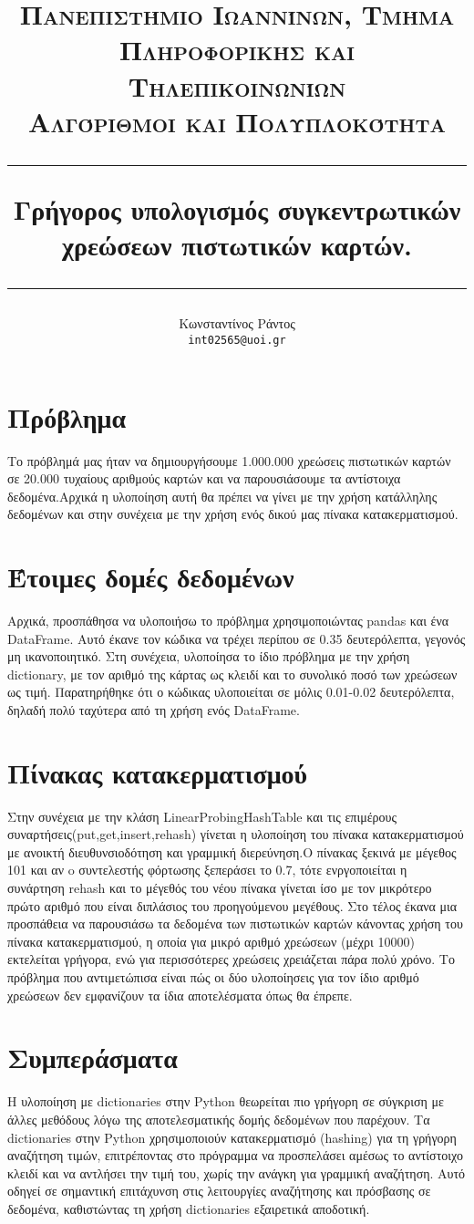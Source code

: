 \documentclass{article}
\title{%
   \normalsize \textsc{Πανεπιστήμιο Ιωαννίνων, Τμήμα Πληροφορικής και Τηλεπικοινωνίων} \\ [1em]
   \normalsize \textsc{Αλγόριθμοι και Πολυπλοκότητα} \\ [1em]
   \vspace{0.5cm}
   \hrule
   \vspace{0.4cm}
   \huge Γρήγορος υπολογισμός συγκεντρωτικών χρεώσεων πιστωτικών καρτών.
   \vspace{0.5cm}
   \hrule
   \vspace{0.5cm}
}
\author{%
   \normalfont
   Κωνσταντίνος Ράντος\\
   \texttt{int02565@uoi.gr}  
}
\date{}
\begin{document}
\maketitle

\section*{Πρόβλημα}
Το πρόβλημά μας ήταν να δημιουργήσουμε 1.000.000 χρεώσεις πιστωτικών καρτών σε 20.000 τυχαίους αριθμούς καρτών και να παρουσιάσουμε τα αντίστοιχα δεδομένα.Αρχικά η υλοποίηση αυτή θα πρέπει να γίνει με την χρήση κατάλληλης δεδομένων και στην συνέχεια με την χρήση ενός δικού μας πίνακα κατακερματισμού.
\vspace{0.5cm}

\section{Έτοιμες δομές δεδομένων}
 Αρχικά, προσπάθησα να υλοποιήσω το πρόβλημα χρησιμοποιώντας pandas και ένα DataFrame. Αυτό έκανε τον κώδικα να τρέχει περίπου σε 0.35 δευτερόλεπτα, γεγονός μη ικανοποιητικό. Στη συνέχεια, υλοποίησα το ίδιο πρόβλημα με την χρήση dictionary, με τον αριθμό της κάρτας ως κλειδί και το συνολικό ποσό των χρεώσεων ως τιμή. Παρατηρήθηκε ότι ο κώδικας υλοποιείται σε μόλις 0.01-0.02 δευτερόλεπτα, δηλαδή πολύ ταχύτερα από τη χρήση ενός DataFrame.

\section{Πίνακας κατακερματισμού}
Στην συνέχεια με την κλάση LinearProbingHashTable και τις επιμέρους συναρτήσεις(put,get,insert,rehash) γίνεται η υλοποίηση του πίνακα κατακερματισμού με ανοικτή διευθυνσιοδότηση και γραμμική διερεύνηση.Ο πίνακας ξεκινά με μέγεθος 101 και αν o συντελεστής φόρτωσης ξεπεράσει το 0.7, τότε ενργοποιείται η συνάρτηση rehash και το μέγεθός του νέου πίνακα  γίνεται ίσο με τον μικρότερο πρώτο αριθμό που είναι διπλάσιος του προηγούμενου μεγέθους. Στο τέλος έκανα μια προσπάθεια να παρουσιάσω τα δεδομένα των πιστωτικών καρτών κάνοντας χρήση του πίνακα κατακερματισμού, η οποία για μικρό αριθμό χρεώσεων (μέχρι 10000) εκτελείται γρήγορα, ενώ για περισσότερες χρεώσεις χρειάζεται πάρα πολύ χρόνο.
Το πρόβλημα που αντιμετώπισα είναι πώς οι δύο υλοποίησεις για τον ίδιο αριθμό χρεώσεων δεν εμφανίζουν τα ίδια αποτελέσματα όπως θα έπρεπε.

\section{Συμπεράσματα}
   Η υλοποίηση με dictionaries στην Python θεωρείται πιο γρήγορη σε σύγκριση με άλλες μεθόδους λόγω της αποτελεσματικής δομής δεδομένων που παρέχουν. Τα dictionaries στην Python χρησιμοποιούν κατακερματισμό (hashing) για τη γρήγορη αναζήτηση τιμών, επιτρέποντας στο πρόγραμμα να προσπελάσει αμέσως το αντίστοιχο κλειδί και να αντλήσει την τιμή του, χωρίς την ανάγκη για γραμμική αναζήτηση. Αυτό οδηγεί σε σημαντική επιτάχυνση στις λειτουργίες αναζήτησης και πρόσβασης σε δεδομένα, καθιστώντας τη χρήση dictionaries εξαιρετικά αποδοτική.
\end{document}

